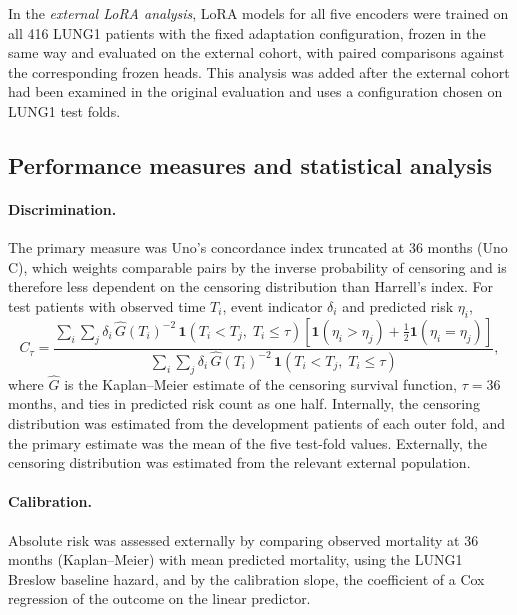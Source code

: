 In the \emph{external LoRA analysis}, LoRA models for all five encoders were trained on all 416 LUNG1 patients with the fixed adaptation configuration, frozen in the same way and evaluated on the external cohort, with paired comparisons against the corresponding frozen heads. This analysis was added after the external cohort had been examined in the original evaluation and uses a configuration chosen on LUNG1 test folds.

\subsection{Performance measures and statistical analysis}\label{sec:stats}
\paragraph{Discrimination.} The primary measure was Uno's concordance index truncated at 36 months (Uno C),\cite{uno2011} which weights comparable pairs by the inverse probability of censoring and is therefore less dependent on the censoring distribution than Harrell's index. For test patients with observed time $T_i$, event indicator $\delta_i$ and predicted risk $\eta_i$,
\begin{equation}\label{eq:unoc}
C_\tau=\frac{\sum_{i}\sum_{j}\delta_i\,\hat{G}(T_i)^{-2}\,\mathbf{1}(T_i<T_j,\;T_i\le\tau)\left[\mathbf{1}(\eta_i>\eta_j)+\frac{1}{2}\mathbf{1}(\eta_i=\eta_j)\right]}{\sum_{i}\sum_{j}\delta_i\,\hat{G}(T_i)^{-2}\,\mathbf{1}(T_i<T_j,\;T_i\le\tau)},
\end{equation}
where $\hat{G}$ is the Kaplan--Meier estimate of the censoring survival function, $\tau=36$ months, and ties in predicted risk count as one half. Internally, the censoring distribution was estimated from the development patients of each outer fold, and the primary estimate was the mean of the five test-fold values. Externally, the censoring distribution was estimated from the relevant external population.

\paragraph{Calibration.} Absolute risk was assessed externally by comparing observed mortality at 36 months (Kaplan--Meier) with mean predicted mortality, using the LUNG1 Breslow baseline hazard, and by the calibration slope, the coefficient of a Cox regression of the outcome on the linear predictor.\cite{vancalster2019,austin2020}

